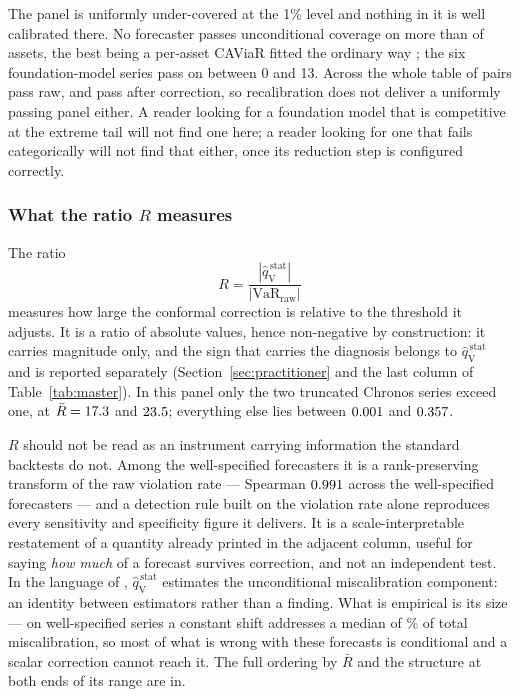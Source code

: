 \documentclass[preprint,11pt,authoryear]{elsarticle}
\newcommand{\VaR}{\mathrm{VaR}}
\newcommand{\1}{\boldsymbol{1}}
\newcommand{\qVstat}{\hat{q}_{\scriptscriptstyle\mathrm{V}}^{\,\mathrm{stat}}}
\begin{document}
The panel is uniformly under-covered at the 1\% level and nothing in it is well
calibrated there. No forecaster passes unconditional coverage on more than
\nMainBestKupiec{} of \nMainAssets{} assets, the best being a per-asset CAViaR
fitted the ordinary way \citep{engle2004caviar}; the six foundation-model series
pass on between 0 and 13. Across the whole table \nMainKupiecRawPasses{} of
\nMainPairs{} pairs pass raw, and \nMainKupiecCorPasses{} pass after correction,
so recalibration does not deliver a uniformly passing panel either. A reader
looking for a foundation model that is competitive at the extreme tail will not
find one here; a reader looking for one that fails categorically will not find
that either, once its reduction step is configured correctly.

\subsubsection{\texorpdfstring{What the ratio $R$ measures}{What the ratio R measures}}
\label{sec:R_meaning}

The ratio
\begin{equation}
	\label{eq:replacement_ratio}
	R = \frac{|\qVstat|}{|\VaR_{\mathrm{raw}}|}
\end{equation}
measures how large the conformal correction is relative to the threshold it
adjusts. It is a ratio of absolute values, hence non-negative by construction: it
carries magnitude only, and the sign that carries the diagnosis belongs to
$\qVstat$ and is reported separately (Section~\ref{sec:practitioner} and the last
column of Table~\ref{tab:master}). In this panel only the two truncated Chronos
series exceed one, at $\bar R = 17.3$ and $23.5$;
everything else lies between $0.001$ and $0.357$.

$R$ should not be read as an instrument carrying information the standard
backtests do not. Among the well-specified forecasters it is a rank-preserving
transform of the raw violation rate --- Spearman $0.991$ across the
\nSpearmanRPiN{} well-specified forecasters --- and a detection rule built on the
violation rate alone reproduces every sensitivity and specificity figure it
delivers. It is a scale-interpretable restatement of a quantity already printed
in the adjacent column, useful for saying \emph{how much} of a forecast survives
correction, and not an independent test. In the language of
\citet{gneiting2023regression}, $\qVstat$ estimates the unconditional
miscalibration component: an identity between estimators rather than a finding.
What is empirical is its size --- on well-specified series a constant shift
addresses a median of \nuMCBSharePct\% of total miscalibration, so most of what
is wrong with these forecasts is conditional and a scalar correction cannot reach
it. The full ordering by $\bar R$ and the structure at both ends of its range are
in.
\end{document}

